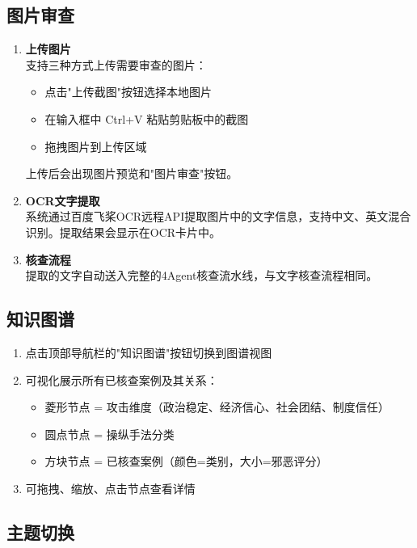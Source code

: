 \documentclass[12pt,a4paper]{ctexart}
\begin{document}
\subsection{图片审查}

\begin{enumerate}[leftmargin=*]

\item \textbf{上传图片}\\
支持三种方式上传需要审查的图片：
\begin{itemize}
    \item 点击"上传截图"按钮选择本地图片
    \item 在输入框中 Ctrl+V 粘贴剪贴板中的截图
    \item 拖拽图片到上传区域
\end{itemize}

上传后会出现图片预览和"图片审查"按钮。

\item \textbf{OCR文字提取}\\
系统通过百度飞桨OCR远程API提取图片中的文字信息，支持中文、英文混合识别。提取结果会显示在OCR卡片中。

\item \textbf{核查流程}\\
提取的文字自动送入完整的4Agent核查流水线，与文字核查流程相同。

\end{enumerate}

\subsection{知识图谱}

\begin{enumerate}[leftmargin=*]
\item 点击顶部导航栏的"知识图谱"按钮切换到图谱视图
\item 可视化展示所有已核查案例及其关系：
    \begin{itemize}
        \item 菱形节点 = 攻击维度（政治稳定、经济信心、社会团结、制度信任）
        \item 圆点节点 = 操纵手法分类
        \item 方块节点 = 已核查案例（颜色=类别，大小=邪恶评分）
    \end{itemize}
\item 可拖拽、缩放、点击节点查看详情
\end{enumerate}

\subsection{主题切换}
\end{document}
